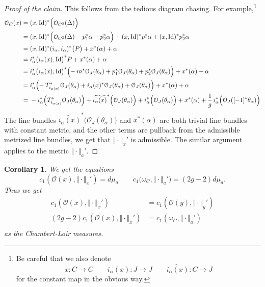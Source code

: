 \documentclass[reqno,11pt]{amsart}
\numberwithin{equation}{section}
\theoremstyle{plain}
\newtheorem{corollary}[theorem]{Corollary}
\theoremstyle{plain}
\numberwithin{equation}{section}
\theoremstyle{remark}
\DeclareMathOperator{\Id}{\operatorname{Id}}
\newcommand{\norm}[1]{\Vert{#1}\Vert}
\begin{document}
\begin{proof}[Proof of the claim]
This follows from the tedious diagram chasing. For example,\footnote{Be careful that we also denote
$$x:C\longrightarrow C \qquad i_{\alpha}(x):J\longrightarrow J \qquad \widetilde{i_{\alpha}(x)}:C\longrightarrow J$$ 
for the constant map in the obvious way.}
\begin{equation*}
\begin{aligned}
 \mathcal{O}_C(x) =\;& (x,\Id)^* \Big(\mathcal{O}_{C^2}(\Delta) \Big) \\ 
  =\;& (x,\Id)^* \Big(\mathcal{O}_{C^2}(\Delta)-p_1^*\alpha-p_2^*\alpha \Big)+(x,\Id)^* p_1^*\alpha+(x,\Id)^* p_2^*\alpha \\ 
  =\;& (x,\Id)^*(i_{\alpha},i_{\alpha})^* \big(P\big) +x^*(\alpha) +\alpha \\ 
  =\;& i_{\alpha}^* \big( i_{\alpha}(x),\Id\!\big)^*P+x^*(\alpha) +\alpha\\ 
  =\;& i_{\alpha}^* \big( i_{\alpha}(x),\Id \!\big)^*\Big(\hspace{-1mm}-m^*\mathcal{O}_{J}(\theta_{\alpha})+p_1^*\mathcal{O}_{J}(\theta_{\alpha})+p_2^*\mathcal{O}_{J}(\theta_{\alpha})\Big)+x^*(\alpha) +\alpha \\ 
  =\;& i_{\alpha}^* \Big(\hspace{-1mm}-T_{i_{\alpha(x)}}^*\mathcal{O}_{J}(\theta_{\alpha})+i_{\alpha}(x)^*\mathcal{O}_{J}(\theta_{\alpha})+\mathcal{O}_{J}(\theta_{\alpha})\Big)+x^*(\alpha) +\alpha \\ 
  =\;& -i_{\alpha}^* \Big(T_{i_{\alpha(x)}}^*\mathcal{O}_{J}(\theta_{\alpha})\Big)+ \widetilde{i_{\alpha}(x)}^*\Big(\mathcal{O}_{J}(\theta_{\alpha})\Big)+i_{\alpha}^* \Big(\mathcal{O}_{J}(\theta_{\alpha})\Big)+x^*(\alpha) +\frac{1}{g} \,i_{\alpha}^* \Big(\mathcal{O}_J([-1]^* \theta_{\alpha}) \Big) \\ 
\end{aligned}
\end{equation*}
The line bundles $\widetilde{i_{\alpha}(x)}^*\Big(\mathcal{O}_{J}(\theta_{\alpha})\Big)$ and $x^*(\alpha)$ are both trivial line bundles with constant metric, and the other terms are pullback from the admissible metrized line bundles, we get that $\norm{\cdot}_x'$ is admissible. The similar argument applies to the metric $\norm{\cdot}_{a}'$.
\end{proof}
\begin{corollary}
We get the equations
$$c_1(\mathcal{O}(x),\norm{\cdot}_x')=d\mu_a \qquad c_1\Big(\omega_C,\norm{\cdot}_a'\Big)=(2g-2)d\mu_a.$$
Thus we get 
\begin{equation*}
\begin{aligned}
  c_1(\mathcal{O}(x),\norm{\cdot}_x')&=c_1(\mathcal{O}(y),\norm{\cdot}_y')  \\ 
  (2g-2)c_1(\mathcal{O}(x),\norm{\cdot}_x')&=c_1(\omega_C,\norm{\cdot}_a')  \\ 
\end{aligned}
\end{equation*}
as the Chambert-Loir measures.
\end{corollary}
\end{document}
